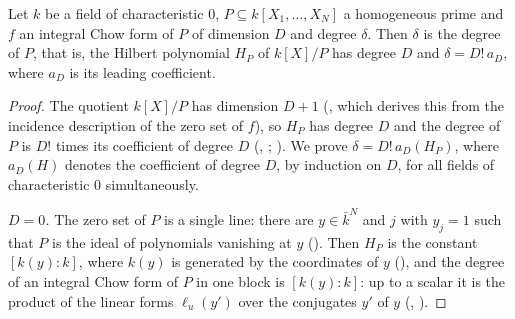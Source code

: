 \begin{proposition}\label{pf:covol:prop:hilbdeg}
Let $k$ be a field of characteristic $0$, $P\subseteq k[X_1,\dots,X_N]$ a homogeneous prime and $f$ an
integral Chow form of $P$ of dimension $D$ and degree $\delta$. Then $\delta$ is the degree of $P$, that is,
the Hilbert polynomial $H_P$ of $k[X]/P$ has degree $D$ and $\delta=D!\,a_D$, where $a_D$ is its leading
coefficient.
\end{proposition}

\begin{proof}
The quotient $k[X]/P$ has dimension $D+1$ (,
which derives this from the incidence description of the zero set of $f$), so $H_P$ has degree $D$ and the
degree of $P$ is $D!$ times its coefficient of degree $D$
(,
; \cite[Thm.~I.7.5]{Hartshorne1977}). We prove
$\delta=D!\,a_D(H_P)$, where $a_D(H)$ denotes the coefficient of degree $D$, by induction on $D$, for all
fields of characteristic $0$ simultaneously.

\emph{$D=0$.} The zero set of $P$ is a single line: there are $y\in\bar k^N$ and $j$ with $y_j=1$ such that
$P$ is the ideal of polynomials vanishing at $y$ ().
Then $H_P$ is the constant $[k(y):k]$, where $k(y)$ is generated by the coordinates of $y$
(), and the degree of an
integral Chow form of $P$ in one block is $[k(y):k]$: up to a scalar it is the product of the linear forms
$\ell_u(y')$ over the conjugates $y'$ of $y$ (,
).


\end{proof}
